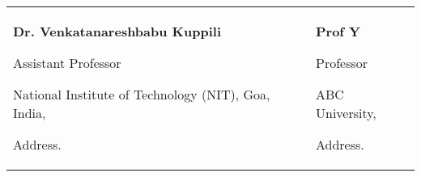 

\begin{tabularx}{\textwidth}{@{}X X@{}}
\textbf{Dr. Venkatanareshbabu Kuppili}\par
Assistant Professor\par
National Institute of Technology (NIT), Goa, India,\par 
Address.\par 
\makefield{\faEnvelopeO}{\url{https://www.nitgoa.ac.in/emp_profile.aspx?nDeptID=131}}
& 
\textbf{Prof Y}\par
Professor\par
ABC University,\par 
Address.\par 
\makefield{\faEnvelopeO}{\url{abc@def.edu}}
\\
\end{tabularx}

